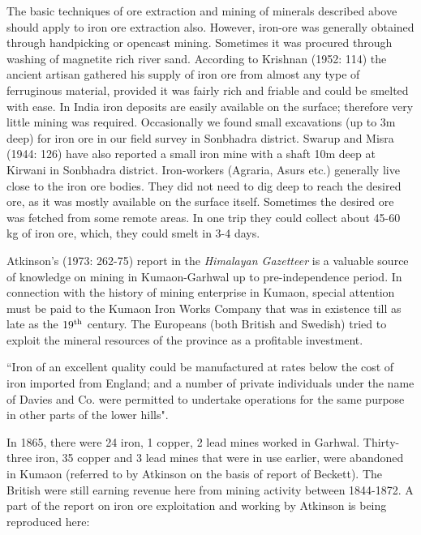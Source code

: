 The basic techniques of ore extraction and mining of minerals described above should apply to iron ore extraction also. However, iron-ore was generally obtained through handpicking or opencast mining. Sometimes it was procured through washing of magnetite rich river sand. According to Krishnan (1952: 114) the ancient artisan gathered his supply of iron ore from almost any type of ferruginous material, provided it was fairly rich and friable and could be smelted with ease. In India iron deposits are easily available on the surface; therefore very little mining was required. Occasionally we found small excavations (up to 3m deep) for iron ore in our field survey in Sonbhadra district. Swarup and Misra (1944: 126) have also reported a small iron mine with a shaft 10m deep at Kirwani in Sonbhadra district. Iron-workers (Agraria, Asurs etc.) generally live close to the iron ore bodies. They did not need to dig deep to reach the desired ore, as it was mostly available on the surface itself. Sometimes the desired ore was fetched from some remote areas. In one trip they could collect about 45-60 kg of iron ore, which, they could smelt in 3-4 days.

Atkinson's (1973: 262-75) report in the {\it Himalayan Gazetteer} is a valuable source of knowledge on mining in Kumaon-Garhwal up to pre-independence period. In connection with the history of mining enterprise in Kumaon, special attention must be paid to the Kumaon Iron Works Company that was in existence till as late as the $19^{\rm th}$ century. The Europeans (both British and Swedish) tried to exploit the mineral resources of the province as a profitable investment.

 ``Iron of an excellent quality could be manufactured at rates below the cost of iron imported from England; and a number of private individuals under the name of Davies and Co. were permitted to undertake operations for the same purpose in other parts of the lower hills". 

In 1865, there were 24 iron, 1 copper, 2 lead mines worked in Garhwal. Thirty-three iron, 35 copper and 3 lead mines that were in use earlier, were abandoned in Kumaon (referred to by Atkinson on the basis of report of Beckett). The British were still earning revenue here from mining activity between 1844-1872. A part of the report on iron ore exploitation and working by Atkinson is being reproduced here:

